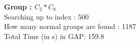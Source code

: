 \textbf{Group : $C_2*C_8$}\\
Searching up to index : 500\\
How many normal groups are found : 1187\\
Total Time (in s) in GAP: 159.8\\
